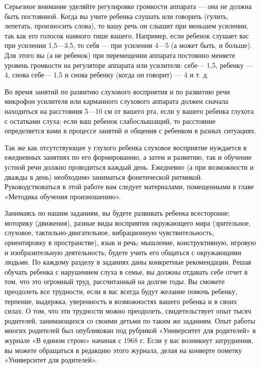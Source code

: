 \documentclass[a5paper]{book}
\begin{document}
Серьезное внимание уделяйте регулировке громкости аппарата --- она не
должна быть постоянной. Когда вы учите ребенка слушать или говорить
(гулить, лепетать, произносить слова), то вашу речь он слышит при
меньшем усилении, так как его голосок намного тише вашего. Например,
если ребенок слушает вас при усилении 1,5---3,5, то себя --- при
усилении 4---5 (а может быть, и больше). Для этого вы (а не ребенок) при
перемещении аппарата постоянно меняете уровень громкости на регуляторе
аппарата или усилителя: себе--- 1,5, ребенку --- 4, снова себе--- 1,5 и
снова ребенку (когда он говорит) --- 4 и т. д.

Во время занятий по развитию слухового восприятия и по развитию речи
микрофон усилителя или карманного слухового аппарата должен сначала
находиться на расстояния 5---10 см от вашего рта, если у вашего ребенка
глухота с остатками слуха; если ваш ребенок слабослышащий, то расстояние
определяется вами в процессе занятий и общения с ребенком в разных
ситуациях.

Так же как отсутствующее у глухого ребенка слуховое восприятие нуждается
в ежедневных занятиях по его формированию, а затем и развитию, так и
обучение устной речи должно проводиться каждый день. Ежедневно (а при
возможности и дважды в день) необходимо заниматься фонетической
ритмикой. Руководствоваться в этой работе вам следует материалами,
помещенными в главе «Методика обучения произношению».

Занимаясь по нашим заданиям, вы будете развивать ребенка всесторонне;
моторику (движения), разные виды восприятия окружающего мира
(зрительное, слуховое, тактильно-двигательное, вибрационную
чувствительность, ориентировку в пространстве), язык и речь; мышление,
конструктивную, игровую и изобразительную деятельность; будете учить его
общаться с окружающими людьми. По каждому разделу в заданиях даны
конкретные рекомендации. Решая обучать ребенка с нарушением слуха в
семье, вы должны отдавать себе отчет в том, что это огромный труд,
рассчитанный на долгие годы. Вы сможете преодолеть все трудности, если в
вас всегда будут желание помочь ребенку, терпение, выдержка, уверенность
в возможностях вашего ребенка и в своих силах. О том, что эти трудности
можно преодолеть, свидетельствует опыт тысяч родителей, занимающихся со
своими детьми по таким же заданиям. Опыт работы многих родителей был
опубликован под рубрикой «Университет для родителей» в журнале «В едином
строю» начиная с 1968 г. Если у вас возникнут затруднения, вы можете
обращаться в редакцию этого журнала, делая на конверте пометку
«Университет для родителей».
\end{document}

